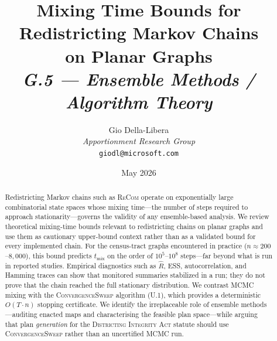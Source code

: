 \documentclass[12pt]{article}
\title{%
  \textbf{Mixing Time Bounds for Redistricting Markov Chains}\\
  \textbf{on Planar Graphs}\\[0.8em]
  \normalsize\textit{G.5 --- Ensemble Methods / Algorithm Theory}%
}
\author{%
  Gio Della-Libera\\
  \textit{Apportionment Research Group}\\
  \small\texttt{giodl@microsoft.com}
}
\date{May 2026}
\newcommand{\recom}{\textsc{ReCom}}
\newcommand{\cs}{\textsc{ConvergenceSweep}}
\newcommand{\dia}{\textsc{Districting Integrity Act}}
\newcommand{\tmix}{\ensuremath{t_{\mathrm{mix}}}}
\newcommand{\rhat}{\ensuremath{\hat{R}}}
\begin{document}
\maketitle

\begin{abstract}
\noindent
Redistricting Markov chains such as \recom{} operate on exponentially
large combinatorial state spaces whose mixing time---the number of
steps required to approach stationarity---governs the validity of any
ensemble-based analysis.
We review theoretical mixing-time bounds relevant to redistricting chains on
planar graphs and use them as cautionary upper-bound context rather than as a
validated bound for every implemented chain.
For the census-tract graphs encountered in practice ($n \approx 200$--$8{,}000$),
this bound predicts $\tmix$ on the order of $10^5$--$10^8$ steps---far
beyond what is run in reported studies.
Empirical diagnostics such as $\rhat$, ESS, autocorrelation, and Hamming traces
can show that monitored summaries stabilized in a run; they do not prove that
the chain reached the full stationary distribution.
We contrast MCMC mixing with the \cs{} algorithm (U.1), which provides
a deterministic $O(T \cdot n)$ stopping certificate.
We identify the irreplaceable role of ensemble methods---auditing enacted
maps and characterising the feasible plan space---while arguing that plan
\emph{generation} for the \dia{} statute should use \cs{} rather than
an uncertified MCMC run.
\end{abstract}

\tableofcontents
\newpage












\end{document}
